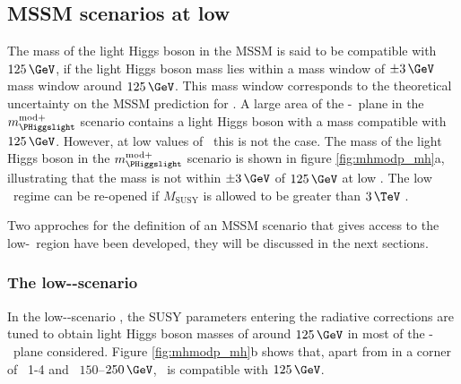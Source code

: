 \subsection{MSSM scenarios at low \tanb}
\label{sec:mssm_theory_lowtb}
The mass of the light Higgs boson in the \ac{MSSM} is said to
be compatible with $125\,\GeV$, if the light Higgs boson mass lies within a 
mass window of $\pm 3\,\GeV$ mass window around $125\,\GeV$. This mass window
corresponds to the theoretical uncertainty on the \ac{MSSM} prediction for \mh.
A large area of the \mA-\tanb~plane in the $m_{\PHiggslight}^{\text{mod+}}$ 
scenario contains a light Higgs boson with a mass compatible with
$125\,\GeV$. However, at low values of \tanb~this is not the case.
The mass of the light Higgs
boson in the $m_{\PHiggslight}^{\text{mod}+}$ scenario is shown in 
figure \ref{fig:mhmodp_mh}a, illustrating that the mass 
is not within $\pm 3\,\GeV$ of $125\,\GeV$ at low \tanb. The low \tanb~regime can be re-opened
if $M_{\text{SUSY}}$ is allowed to be greater than $3\,\TeV$ \cite{MSSM-reopen}. 
%


Two approches for the definition of an \ac{MSSM} scenario that gives
access to the low-\tanb~region have been developed, they will be
discussed in the next sections.

\subsubsection{The low-\tanb-scenario}
\label{sec:theory_BSM_model_lowtb}
In the low-\tanb-scenario \cite{Hein-low-tb-high,MSSM-lowtanb}, the SUSY parameters entering
the radiative corrections are tuned to obtain light 
Higgs boson masses of around $125\,\GeV$ in most of the \mA-\tanb~plane considered.
Figure \ref{fig:mhmodp_mh}b shows that, apart from in a corner of \tanb~1-4 and 
\mA~$150$--$250\,\GeV$, \mh~is compatible with $125\,\GeV$.

